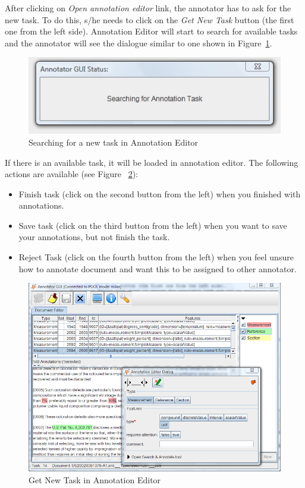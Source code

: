 After clicking on \emph{Open annotation editor} link, the annotator has to ask
for the new task. To do this, s/he needs to click on the \emph{Get New Task}
button (the first one from the left side).
Annotation Editor will start to search for available tasks and the annotator
will see the dialogue similar to one shown in
Figure~\ref{fig:getnewtaskineditor}.
\begin{figure}[htb]
\centering
\includegraphics[scale=0.4]{getnewtaskineditor}
\caption{Searching for a new task in Annotation Editor}
\label{fig:getnewtaskineditor}
\end{figure}

If there is an available task, it will be loaded in annotation editor.
The following actions are available (see Figure
~\ref{fig:annotationtaskineditor}):
\begin{itemize}
  \item Finish task (click on the second button from the left) when you finished
with annotations.
  \item Save task (click on the third button from the left) when you want to
save your annotations, but not finish the task.
  \item Reject Task (click on the fourth button from the left) when you feel
unsure how to annotate document and want this to be assigned to other annotator.
\end{itemize}

\begin{figure}[htb]
\centering
\includegraphics[scale=0.4]{annotationtaskineditor}
\caption{Get New Task in Annotation Editor}
\label{fig:annotationtaskineditor}
\end{figure}

